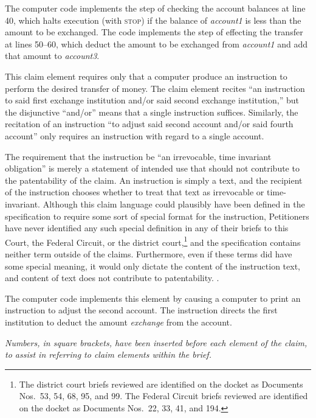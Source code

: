 \documentclass{scotus}
\begin{document}
The computer code implements the step of checking the account balances at line
40, which halts execution (with \textsc{stop}) if the balance of
\emph{account1} is less than the amount to be exchanged. The code implements the
step of effecting the transfer at lines 50--60, which deduct the amount to be
exchanged from \emph{account1} and add that amount to \emph{account3}.


This claim element requires only that a computer produce an instruction to
perform the desired transfer of money. The claim element recites ``an
instruction to said first exchange institution and/or said second exchange
institution,'' but the disjunctive ``and/or'' means that a single instruction
suffices. Similarly, the recitation of an instruction ``to adjust said second
account and/or said fourth account'' only requires an instruction with regard to
a single account.

The requirement that the instruction be ``an irrevocable, time invariant
obligation'' is merely a statement of intended use that should not contribute to
the patentability of the claim. An instruction is simply a text, and the
recipient of the instruction chooses whether to treat that text as irrevocable
or time-invariant. Although this claim language could plausibly have been
defined in the specification to require some sort of special format for the
instruction, Petitioners have never identified any such special definition in
any of their briefs to this Court, the Federal Circuit, or the district
court,\footnote{The district court briefs reviewed are identified on the docket
as Documents Nos.\ 53, 54, 68, 95, and 99. The Federal Circuit briefs reviewed
are identified on the docket as Documents Nos.\ 22, 33, 41, and 194.}
and the
specification contains neither term outside of the claims. Furthermore, even if
these terms did have some special meaning, it would only dictate the content of
the instruction text, and content of text does not contribute to patentability.
.

The computer code implements this element by causing a computer to print an
instruction to adjust the second account. The instruction directs the
first institution to deduct the amount \emph{exchange} from the account.


\emph{Numbers, in square brackets, have been inserted before each element of the
claim, to assist in referring to claim elements within the brief.}

\wholeclaim
\end{document}
